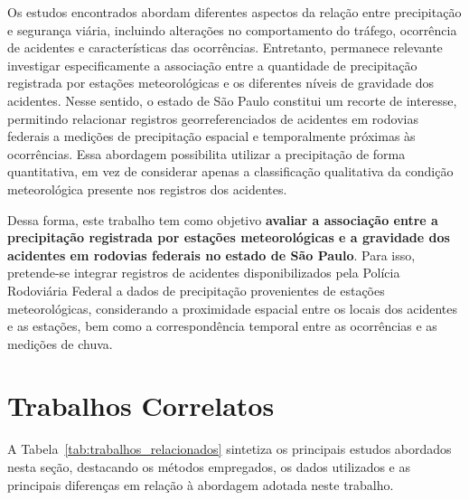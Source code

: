 \documentclass[12pt]{article}
\begin{document}
Os estudos encontrados abordam diferentes aspectos da relação entre precipitação e segurança viária, incluindo alterações no comportamento do tráfego, ocorrência de acidentes e características das ocorrências. Entretanto, permanece relevante investigar especificamente a associação entre a quantidade de precipitação registrada por estações meteorológicas e os diferentes níveis de gravidade dos acidentes. Nesse sentido, o estado de São Paulo constitui um recorte de interesse, permitindo relacionar registros georreferenciados de acidentes em rodovias federais a medições de precipitação espacial e temporalmente próximas às ocorrências. Essa abordagem possibilita utilizar a precipitação de forma quantitativa, em vez de considerar apenas a classificação qualitativa da condição meteorológica presente nos registros dos acidentes.

Dessa forma, este trabalho tem como objetivo \textbf{avaliar a associação entre a precipitação registrada por estações meteorológicas e a gravidade dos acidentes em rodovias federais no estado de São Paulo}. Para isso, pretende-se integrar registros de acidentes disponibilizados pela Polícia Rodoviária Federal a dados de precipitação provenientes de estações meteorológicas, considerando a proximidade espacial entre os locais dos acidentes e as estações, bem como a correspondência temporal entre as ocorrências e as medições de chuva.

\section{Trabalhos Correlatos}

A Tabela~\ref{tab:trabalhos_relacionados} sintetiza os principais estudos
abordados nesta seção, destacando os métodos empregados, os dados utilizados
e as principais diferenças em relação à abordagem adotada neste trabalho.
\end{document}
